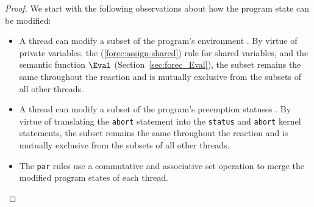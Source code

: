 \begin{proof}
	We start with the following observations about how the program state can be modified:
	\begin{itemize}
		\item A thread can modify a subset of the program's environment 
			  \Environment{}. By virtue of private variables, the (\ref{forec:assign-shared}) 
			  rule for shared variables, and the semantic 
			  function $\Eval$ (Section~\ref{sec:forec_Eval}), the subset remains 
			  the same throughout the reaction and is mutually exclusive from the
			  subsets of all other threads.
		
		\item A thread can modify a subset of the program's preemption statuses \Abort{}. 
			  By virtue of translating the \verb$abort$ statement into the \verb$status$ 
			  and \verb$abort$ kernel statements, the subset remains the same throughout
			  the reaction and is mutually exclusive from the subsets of all other threads.
			  
		\item The \verb$par$ rules use a commutative and associative set operation to
			  merge the modified program states of each thread.


\end{itemize}
\end{proof}
